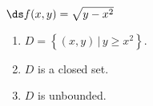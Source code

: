 {$\ds f(x,y) = \sqrt{y-x^2}$}
{\begin{enumerate}
\item $D = \left\{(x,y)\, |\, y\geq x^2\right\}$.
\item $D$ is a closed set.
\item	$D$ is unbounded.
\end{enumerate}
}